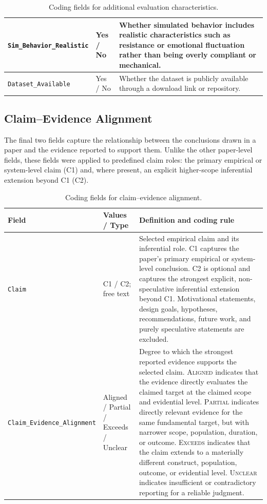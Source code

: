 \begin{table}[p]
\begin{tabular}{p{4.3cm}p{1.9cm}p{8.5cm}}
\texttt{Sim\_Behavior\_Realistic}
&
Yes / No
&
Whether simulated behavior includes realistic characteristics such as resistance or emotional fluctuation rather than being overly compliant or mechanical.
\\
\midrule

\texttt{Dataset\_Available}
&
Yes / No
&
Whether the dataset is publicly available through a download link or repository.
\\

\bottomrule
\end{tabular}
\caption{Coding fields for additional evaluation characteristics.}
\label{tab:codebook-quality}
\end{table}

\subsection{Claim--Evidence Alignment}
\label{app:claim-coding}

The final two fields capture the relationship between the conclusions drawn
in a paper and the evidence reported to support them. Unlike the other
paper-level fields, these fields were applied to predefined claim roles:
the primary empirical or system-level claim (C1) and, where present,
an explicit higher-scope inferential extension beyond C1 (C2).

\begin{table}[p]
\centering
\small
\begin{tabular}{p{4.2cm}p{3.0cm}p{7.5cm}}
\toprule
\textbf{Field} & \textbf{Values / Type} &
\textbf{Definition and coding rule} \\
\midrule

\texttt{Claim}
&
C1 / C2; free text
&
Selected empirical claim and its inferential role.
C1 captures the paper's primary empirical or system-level conclusion.
C2 is optional and captures the strongest explicit, non-speculative
inferential extension beyond C1.
Motivational statements, design goals, hypotheses, recommendations,
future work, and purely speculative statements are excluded.
\\
\midrule

\texttt{Claim\_Evidence\_Alignment}
&
Aligned / Partial / Exceeds / Unclear
&
Degree to which the strongest reported evidence supports the selected claim.
\textsc{Aligned} indicates that the evidence directly evaluates the claimed
target at the claimed scope and evidential level.
\textsc{Partial} indicates directly relevant evidence for the same fundamental
target, but with narrower scope, population, duration, or outcome.
\textsc{Exceeds} indicates that the claim extends to a materially different
construct, population, outcome, or evidential level.
\textsc{Unclear} indicates insufficient or contradictory reporting for a
reliable judgment.
\\

\bottomrule
\end{tabular}
\caption{Coding fields for claim--evidence alignment.}
\label{tab:codebook-claims}
\end{table}

